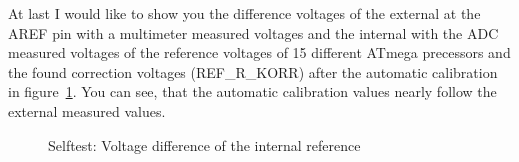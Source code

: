 At last I would like to show you the difference voltages of the external at the
AREF pin with a multimeter measured voltages and the internal with the ADC
measured voltages of the reference voltages of 15 different ATmega precessors
and the found correction voltages (REF\_R\_KORR) after the automatic calibration in
figure~\ref{fig:SelfTrefDiff}.
You can see, that the automatic calibration values nearly follow the external measured values.

\begin{figure}[H]
  \centering
  \resizebox{9cm}{!}{}
  \caption{Selftest: Voltage difference of the internal reference}
  \label{fig:SelfTrefDiff}
\end{figure}

